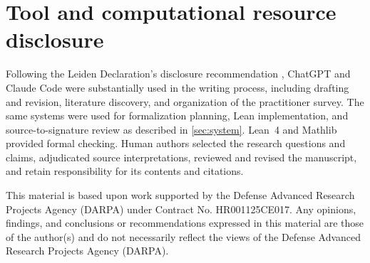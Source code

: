 \documentclass{article}
\begin{document}
\section*{Tool and computational resource disclosure}
Following the Leiden Declaration's disclosure recommendation
\citep{leiden2026declaration}, ChatGPT and Claude Code were substantially
used in the writing process, including drafting and revision, literature
discovery, and organization of the practitioner survey.  The same systems were
used for formalization planning, Lean implementation, and source-to-signature
review as described in \cref{sec:system}.  Lean~4 and Mathlib provided formal
checking.  Human authors selected the research questions and claims,
adjudicated source interpretations, reviewed and revised the manuscript, and
retain responsibility for its contents and citations.

\begin{ack}
This material is based upon work supported by the Defense Advanced Research
Projects Agency (DARPA) under Contract No. HR001125CE017. Any opinions, findings,
and conclusions or recommendations expressed in this material are those of the
author(s) and do not necessarily reflect the views of the Defense Advanced
Research Projects Agency (DARPA).
\end{ack}

\clearpage
\begingroup
\sloppy


\endgroup

\clearpage
\appendix


\clearpage

\end{document}
